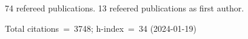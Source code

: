 74 refereed publications. 13 refeered publications as first author.

Total citations~=~3748; h-index~=~34 (2024-01-19)